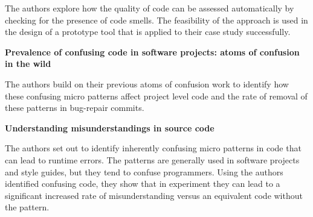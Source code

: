 \documentclass[a4paper]{article}
\begin{document}
\cite{emden_java_2002}
The authors explore how the quality of code can be assessed automatically by checking for the presence of code smells. The feasibility of the approach is used in the design of a prototype tool that is applied to their case study successfully.

\textbf{Prevalence of confusing code in software projects: atoms of confusion in the wild}

\cite{gopstein_prevalence_2018}
The authors build on their previous atoms of confusion work to identify how these confusing micro patterns affect project level code and the rate of removal of these patterns in bug-repair commits. 

\textbf{Understanding misunderstandings in source code}

\cite{gopstein_understanding_2017}
The authors set out to identify inherently confusing micro patterns in code that can lead to runtime errors. The patterns are generally used in 
software projects and style guides, but they tend to confuse programmers. Using the authors identified confusing code, they show that in experiment they can lead to a significant increased rate of misunderstanding versus an equivalent code without the pattern.



\end{document}
